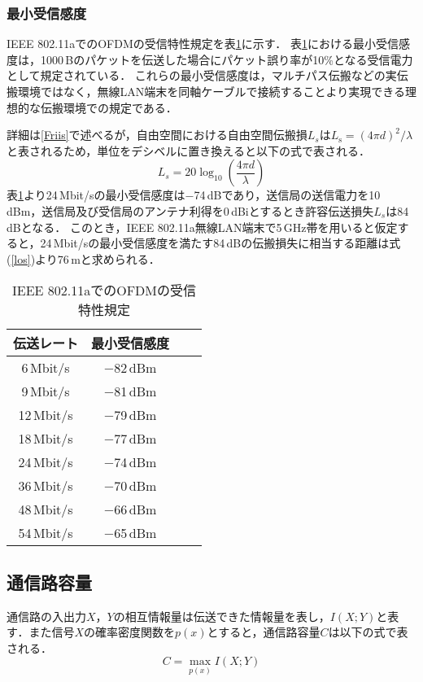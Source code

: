 \documentclass[master]{kuisthesis}		%
\begin{document}
\subsubsection{最小受信感度}\label{最小受信感度}
IEEE 802.11aでのOFDMの受信特性規定を表\ref{sens}に示す\cite{musenlan}．
表\ref{sens}における最小受信感度は，1000\,Bのパケットを伝送した場合にパケット誤り率が10\%となる受信電力として規定されている．
これらの最小受信感度は，マルチパス伝搬などの実伝搬環境ではなく，無線LAN端末を同軸ケーブルで接続することより実現できる理想的な伝搬環境での規定である．

詳細は\ref{Friis}で述べるが，自由空間における自由空間伝搬損$L_s$は$L_\mathrm{s} = (4\pi d)^2/\lambda$と表されるため，単位をデシベルに置き換えると以下の式で表される．
\begin{equation}
\label{los}
L_s = 20\log_{10}{\left(\frac{4\pi d}{\lambda}\right)}
\end{equation}
表\ref{sens}より24\,Mbit/sの最小受信感度は$-$74\,dBであり，送信局の送信電力を10\,dBm，送信局及び受信局のアンテナ利得を0\,dBiとするとき許容伝送損失$L_s$は84\,dBとなる．
このとき，IEEE 802.11a無線LAN端末で5\,GHz帯を用いると仮定すると，24\,Mbit/sの最小受信感度を満たす84\,dBの伝搬損失に相当する距離は式(\ref{los})より76\,mと求められる．

\ifnum {}
\begin{table}[t]
\caption{IEEE 802.11aでのOFDMの受信特性規定}
\label{sens}
\begin{center}
\begin{tabular}{cccc}
\hline
伝送レート & 最小受信感度 \\\hline
6\,Mbit/s & $-$82\,dBm \\
9\,Mbit/s & $-$81\,dBm \\
12\,Mbit/s & $-$79\,dBm \\
18\,Mbit/s & $-$77\,dBm \\
24\,Mbit/s & $-$74\,dBm \\
36\,Mbit/s & $-$70\,dBm \\
48\,Mbit/s & $-$66\,dBm \\
54\,Mbit/s & $-$65\,dBm \\
\hline 
\end{tabular}
\end{center}
\end{table}
\fi

\subsection{通信路容量}
\label{tsuusinro}
通信路の入出力$X$，$Y$の相互情報量は伝送できた情報量を表し，$I(X;Y)$と表す．また信号$X$の確率密度関数を$p(x)$とすると，通信路容量$C$は以下の式で表される．
\begin{equation}
C = \max_{p(x)} I (X;Y)
\end{equation}
\end{document}
